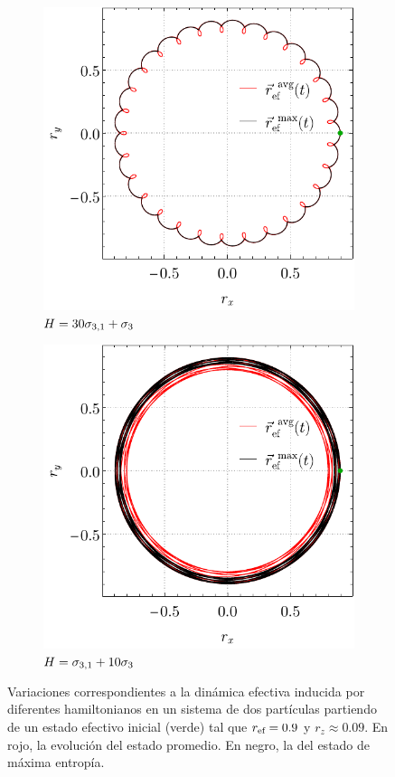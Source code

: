 \begin{figure}[ht!]
    \centering
    \begin{subfigure}{0.5\textwidth}
      \centering
      \includegraphics[width=0.8\linewidth]{chapter5/figures/local_AvgVSMax_p2=0.1_r=0.9_w1=30_w2=1.pdf}
      \caption{$H=30\sigma_{3,1}+\sigma_{3}$}
    \end{subfigure}%
    \begin{subfigure}{0.5\textwidth}
      \centering
      \includegraphics[width=0.8\linewidth]{chapter5/figures/local_AvgVSMax_p2=0.1_r=0.9_w1=1_w2=10.pdf}
      \caption{$H=\sigma_{3,1}+10\sigma_{3}$}
    \end{subfigure}
    \caption{Variaciones correspondientes a la dinámica efectiva inducida por diferentes hamiltonianos en un sistema de dos partículas partiendo de un estado efectivo inicial (verde) tal que $r_{\text{ef}}=0.9$ y $r_{z}\approx0.09$. En rojo, la evolución del estado promedio. En negro, la del estado de máxima entropía. \label{ap:EffDunAVGvsMaxEnt2}}
\end{figure}

